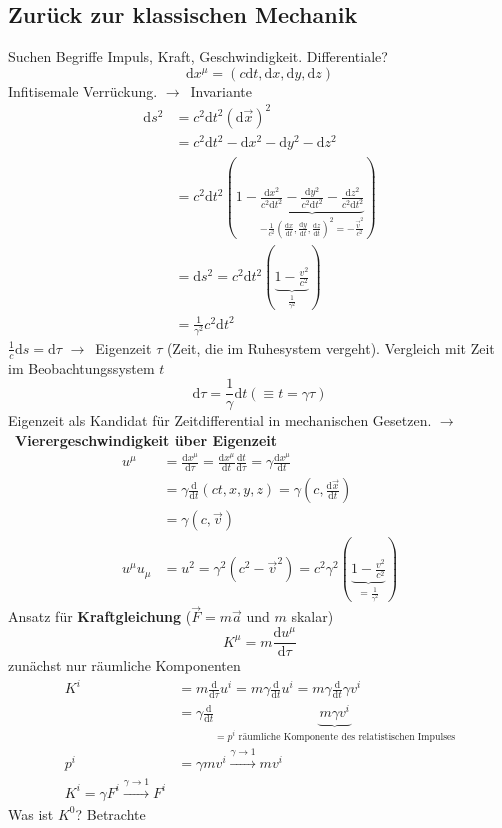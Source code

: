 \documentclass[oneside]{book}
\theoremstyle{definition}
\newcommand{\conseq}{$\rightarrow$~}
\renewcommand{\d}{\mathrm d}
\newcommand{\dd}[1]{\frac{\d}{\d #1}}
\newcommand{\ddd}[2]{\frac{\d #1}{\d #2}}
\begin{document}
\subsection{Zurück zur klassischen Mechanik}
Suchen Begriffe Impuls, Kraft, Geschwindigkeit. Differentiale?
$$\d x^\mu = (c \d t, \d x, \d y, \d z)$$
Infitisemale Verrückung.
\conseq Invariante
\begin{align*}
 \d s^2  &= c^2 \d t^2 (\d \vec{x})^2\\
 & = c^2 \d t^2 - \d x^2 - \d y^2 - \d z^2\\
 & = c^2 \d t^2 (1 - \underbrace{\frac{\d x^2}{c^2 \d t^2} - \frac{\d y^2}{c^2 \d t^2} - \frac{\d z^2}{c^2 \d t^2}}_{- \frac{1}{c^2} (\ddd x t, \ddd y t, \ddd z t)^2 = - \frac{\vec{v}^2}{c^2}})\\
 & = \d s^2 = c^2 \d t^2 (\underbrace{1 - \frac{v^2}{c^2}}_{\frac{1}{\gamma^2}})\\
 & = \frac{1}{\gamma^2} c^2 \d t^2
\end{align*}
$\frac{1}{c} \d s = \d \tau$ \conseq Eigenzeit $\tau$ (Zeit, die im Ruhesystem vergeht).
Vergleich mit Zeit im Beobachtungssystem $t$
$$\d \tau = \frac{1}{\gamma} \d t (\equiv t = \gamma \tau)$$
Eigenzeit als Kandidat für Zeitdifferential in mechanischen Gesetzen.
\conseq \textbf{Vierergeschwindigkeit über Eigenzeit}
\begin{align*}
	u^\mu &= \ddd{x^\mu}{\tau} = \ddd{x^\mu}{t} \ddd t \tau = \gamma \ddd{x^\mu}{t}\\
	&= \gamma \dd t (c t, x, y, z) = \gamma (c, \ddd{\vec{x}}{t})\\
	&= \gamma (c, \vec{v})\\
	u^\mu u_\mu &= u^2 = \gamma^2 (c^2 - \vec{v}^2) = c^2 \gamma^2 (\underbrace{1 - \frac{v^2}{c^2}}_{= \frac{1}{\gamma^2}})
\end{align*}
Ansatz für \textbf{Kraftgleichung} ($\vec{F} = m \vec{a}$ und $m$ skalar)
$$K^\mu = m \ddd{u^\mu}{\tau}$$
zunächst nur räumliche Komponenten
\begin{align*}
	K^i &= m \dd \tau u^i = m \gamma \dd t u^i = m \gamma \dd t \gamma v^i\\
	&= \gamma \dd t \underbrace{m \gamma v^i}_{= p^i \text{~räumliche Komponente des relatistischen Impulses}}\\
	p^i &= \gamma m v^i \xrightarrow{\gamma \to 1} m v^i\\
	K^i = \gamma F^i \xrightarrow{\gamma \to 1} F^i
\end{align*}
Was ist $K^0$? Betrachte
\end{document}
